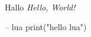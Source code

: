 \documentclass{article}
\begin{document}
Hallo \textit{Hello, World!}


\begin{luacode}

    -- lua
    print("hello lua")
\end{luacode}
\end{document}
